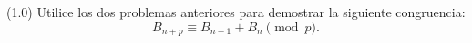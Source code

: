 
(1.0) Utilice los dos problemas anteriores para demostrar la siguiente congruencia:
\[
  B_{n+p} \equiv B_{n+1} + B_n \pmod{p}.
\]

